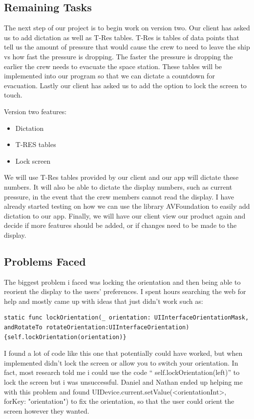 \documentclass[onecolumn, draftclsnofoot,10pt, compsoc]{IEEEtran}
\begin{document}
\subsection{Remaining Tasks}
  The next step of our project is to begin work on version two. 
  Our client has asked us to add dictation as well as T-Res tables.
  T-Res is tables of data points that tell us the amount of pressure that would cause the crew to need to leave the ship vs how fast the pressure is dropping. 
  The faster the pressure is dropping the earlier the crew needs to evacuate the space station. 
  These tables will be implemented into our program so that we can dictate a countdown for evacuation. 
  Lastly our client has asked us to add the option to lock the screen to touch.
  
  Version two features:
  \begin{itemize}
    \item Dictation
    \item T-RES tables
    \item Lock screen
  \end{itemize}

  We will use T-Res tables provided by our client and our app will dictate these numbers.
  It will also be able to dictate the display numbers, such as current pressure, in the event that the crew members cannot read the display.
  I have already started testing on how we can use the library AVFoundation to easily add dictation to our app. 
  Finally, we will have our client view our product again and decide if more features should be added, or if changes need to be made to the display.     

\subsection{Problems Faced}
The biggest problem i faced was locking the orientation and then being able to reorient the display to the users’ preferences.
I spent hours searching the web for help and mostly came up with ideas that just didn't work such as:

\begin{lstlisting}
static func lockOrientation(_ orientation: UIInterfaceOrientationMask, andRotateTo rotateOrientation:UIInterfaceOrientation) {self.lockOrientation(orientation)}
\end{lstlisting}

    I found a lot of code like this one that potentially could have worked, but when implemented didn't lock the screen or allow you to switch your orientation.
    In fact, most research told me i could use the code “ self.lockOrientation(left)” to lock the screen but i was unsuccessful.
    Daniel and Nathan ended up helping me with this problem and found {UIDevice.current.setValue(<orientationInt>, forKey: "orientation")} to fix the orientation, so that the user could orient the screen however they wanted. 
    
\end{document}
